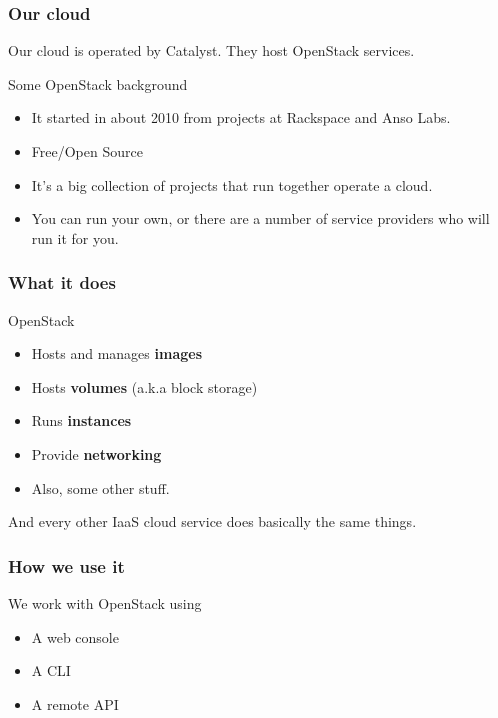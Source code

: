 \documentclass[10pt]{beamer}
\begin{document}
\begin{frame}
  \frametitle{Our cloud}
  
   Our cloud is operated by Catalyst. They host OpenStack services.
   
   Some OpenStack background
   \begin{itemize}
     \item It started in about 2010 from projects at Rackspace and Anso Labs.
     \item Free/Open Source
     \item It's a big collection of projects that run together operate a cloud.
     \item You can run your own, or there are a number of service providers who will run it for you.
     \end{itemize}
\end{frame}

\begin{frame}
  \frametitle{What it does}
  
      
   OpenStack   
   \begin{itemize}
     \item Hosts and manages \textbf{images}
     \item Hosts \textbf{volumes} (a.k.a block storage)
     \item Runs \textbf{instances}
     \item Provide \textbf{networking}
     \item Also, some other stuff.
     \end{itemize}
     
     And every other IaaS cloud service does basically the same things.
\end{frame}

\begin{frame}
  \frametitle{How we use it}
  
   
   
   We work with OpenStack using
   \begin{itemize}
     \item A web console
     \item A CLI
     \item A remote API
     \end{itemize}
\end{frame}
\end{document}
